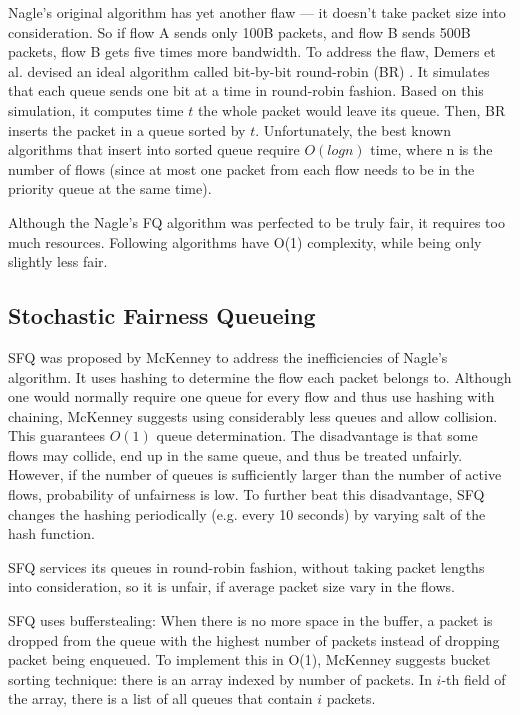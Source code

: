 Nagle's original algorithm has yet another flaw --- it doesn't take packet size into consideration. So if flow A sends only 100B packets, and flow B sends 500B packets, flow B gets five times more bandwidth. To address the flaw,  Demers et al. devised an ideal algorithm called bit-by-bit round-robin (BR) \cite{demers1989analysis}. It simulates that each queue sends one bit at a time in round-robin fashion. Based on this simulation, it computes time $t$ the whole packet would leave its queue. Then, BR inserts the packet in a queue sorted by $t$. Unfortunately, the best known algorithms that insert into sorted queue require $O(log n)$ time, where n is the number of flows (since at most one packet from each flow needs to be in the priority queue at the same time).

Although the Nagle's FQ algorithm was perfected to be truly fair, it requires too much resources. Following algorithms have O(1) complexity, while being only slightly less fair.


\subsection{Stochastic Fairness Queueing}

SFQ was proposed by McKenney \cite{SFQ} to address the inefficiencies of Nagle’s algorithm. It uses hashing to determine the flow each packet belongs to. Although one would normally require one queue for every flow and thus use hashing with chaining, McKenney suggests using considerably less queues and allow collision. This guarantees $O(1)$ queue determination. The disadvantage is that some flows may collide, end up in the same queue, and thus be treated unfairly. However, if the number of queues is sufficiently larger than the number of active flows, probability of unfairness is low. To further beat this disadvantage, SFQ changes the hashing periodically (e.g. every 10 seconds) by varying salt of the hash function.

SFQ services its queues in round-robin fashion, without taking packet lengths into consideration, so it is unfair, if average packet size vary in the flows.

SFQ uses bufferstealing: When there is no more space in the buffer, a packet is dropped from the queue with the highest number of packets instead of dropping packet being enqueued. To implement this in O(1), McKenney suggests bucket sorting technique: there is an array indexed by number of packets. In $i$-th field of the array, there is a list of all queues that contain $i$ packets.

